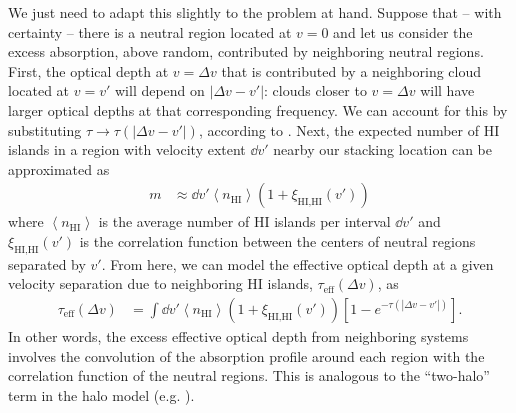 We just need to adapt this slightly to the problem at hand. Suppose that  -- with certainty -- there is a neutral region located at $v=0$ and let us consider the excess absorption, above random, contributed
by neighboring neutral regions. 
First, the optical depth at $v = \Delta v$ that is contributed by a neighboring cloud located at $v = v'$ will depend on $|\Delta v - v'|$: clouds closer to $v = \Delta v$ will have larger optical depths at that corresponding frequency. We can account for this by substituting $\tau \to \tau(|\Delta v - v'|)$, according to .  Next, the expected number of HI islands in a region with velocity extent $\dd v'$ nearby our stacking location can be approximated as
\begin{align}
m &\approx \dd v' \left\langle n_{\text{HI}} \right\rangle (1 + \xi_{\text{HI,HI}}(v'))
\end{align}
where $\left\langle n_{\text{HI}} \right\rangle$ is the average number of HI islands per interval $\dd v'$ and $\xi_{\text{HI,HI}}(v')$ is the correlation function between the centers of neutral regions separated by $v'$. 
From here, we can model the effective optical depth at a given velocity separation due to neighboring HI islands, $\tau_{\text{eff}}(\Delta v)$, as
\begin{align}
\tau_{\text{eff}}(\Delta v) &= \int \dd v' \left\langle n_{\text{HI}} \right\rangle \left(1+\xi_{\text{HI,HI}}(v')\right) \left[ 1 - e^{-\tau(|\Delta v - v'|)} \right] \label{eq:taueff}.
\end{align}
In other words, the excess effective optical depth from neighboring systems involves the convolution of the absorption profile around each region with the correlation function of the neutral regions. 
This is analogous to the ``two-halo'' term in the halo model (e.g. \citealt{Cooray:2002dia}).

